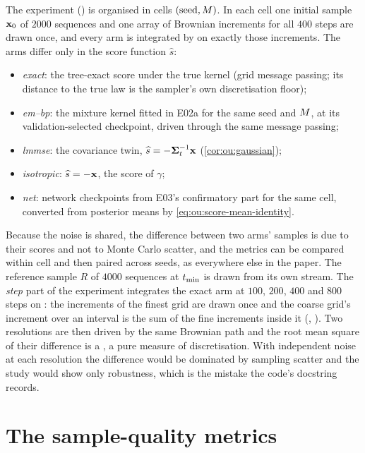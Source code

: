 The experiment () is organised in cells
$(\text{seed},M)$. In each cell one initial sample $\mathbf{x}_0$ of $2000$ sequences and
one array of Brownian increments for all $400$ steps are drawn once, and every arm is
integrated by  on exactly those increments. The
arms differ only in the score function $\widehat s$:
\begin{itemize}
\item \emph{exact}: the tree-exact score under the true kernel (grid message passing;
  its distance to the true law is the sampler's own discretisation floor);
\item \emph{em--bp}: the mixture kernel fitted in E02a for the same seed and $M$,
  at its validation-selected checkpoint, driven through the same message passing;
\item \emph{lmmse}: the covariance twin, $\widehat s=-\mathbf{\Sigma}_t^{-1}\mathbf{x}$
  (\cref{cor:ou:gaussian});
\item \emph{isotropic}: $\widehat s=-\mathbf{x}$, the score of $\gamma$;
\item \emph{net}: network checkpoints from E03's confirmatory part for the same cell,
  converted from posterior means by \cref{eq:ou:score-mean-identity}.
\end{itemize}
Because the noise is shared, the difference between two arms' samples is due to their
scores and not to Monte Carlo scatter, and the metrics can be compared within cell and
then paired across seeds, as everywhere else in the paper. The reference sample $R$ of
$4000$ sequences at $t_{\min}$ is drawn from its own stream. The \emph{step} part of the
experiment integrates the exact arm at $100$, $200$, $400$ and $800$ steps on
: the increments of the finest grid are drawn once and the
coarse grid's increment over an interval is the sum of the fine increments inside it
(, ). Two resolutions are then
driven by the same Brownian path and the root mean square of their difference is a
, a pure measure of discretisation. With independent noise at each
resolution the difference would be dominated by sampling scatter and the study would
show only robustness, which is the mistake the code's docstring records.

\section{The sample-quality metrics}
\label{sec:rev:metrics}

